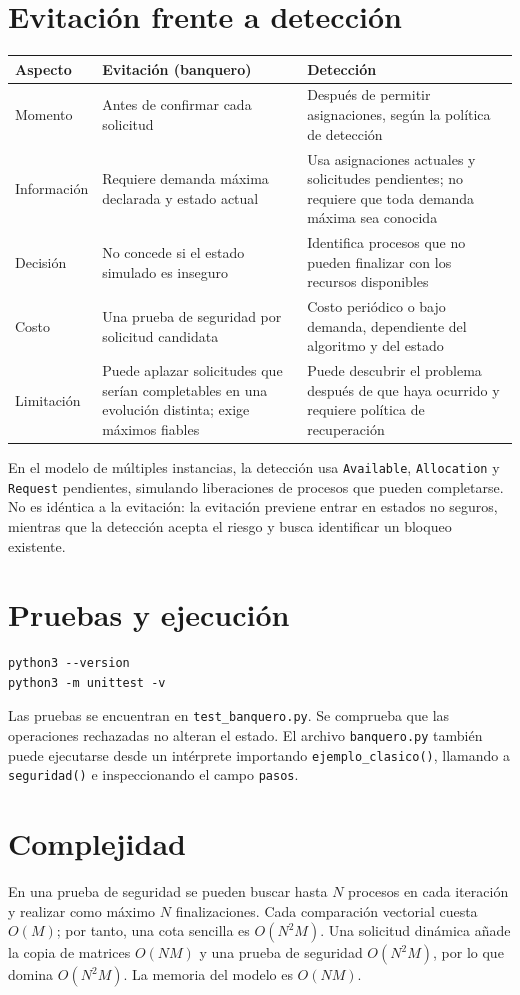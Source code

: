 \documentclass[12pt,a4paper]{article}
\begin{document}
\section{Evitación frente a detección}
\begin{table}[H]\centering\small
\begin{tabularx}{\linewidth}{p{2.6cm}X X}
\toprule
\textbf{Aspecto} & \textbf{Evitación (banquero)} & \textbf{Detección}\\\midrule
Momento & Antes de confirmar cada solicitud & Después de permitir asignaciones, según la política de detección\\
Información & Requiere demanda máxima declarada y estado actual & Usa asignaciones actuales y solicitudes pendientes; no requiere que toda demanda máxima sea conocida\\
Decisión & No concede si el estado simulado es inseguro & Identifica procesos que no pueden finalizar con los recursos disponibles\\
Costo & Una prueba de seguridad por solicitud candidata & Costo periódico o bajo demanda, dependiente del algoritmo y del estado\\
Limitación & Puede aplazar solicitudes que serían completables en una evolución distinta; exige máximos fiables & Puede descubrir el problema después de que haya ocurrido y requiere política de recuperación\\
\bottomrule
\end{tabularx}\end{table}
En el modelo de múltiples instancias, la detección usa \texttt{Available}, \texttt{Allocation} y \texttt{Request} pendientes, simulando liberaciones de procesos que pueden completarse. No es idéntica a la evitación: la evitación previene entrar en estados no seguros, mientras que la detección acepta el riesgo y busca identificar un bloqueo existente.
\section{Pruebas y ejecución}
\begin{lstlisting}[style=console]
python3 --version
python3 -m unittest -v
\end{lstlisting}
Las pruebas se encuentran en \texttt{test\_banquero.py}. Se comprueba que las operaciones rechazadas no alteran el estado. El archivo \texttt{banquero.py} también puede ejecutarse desde un intérprete importando \texttt{ejemplo\_clasico()}, llamando a \texttt{seguridad()} e inspeccionando el campo \texttt{pasos}.
\section{Complejidad}
En una prueba de seguridad se pueden buscar hasta $N$ procesos en cada iteración y realizar como máximo $N$ finalizaciones. Cada comparación vectorial cuesta $O(M)$; por tanto, una cota sencilla es $O(N^2M)$. Una solicitud dinámica añade la copia de matrices $O(NM)$ y una prueba de seguridad $O(N^2M)$, por lo que domina $O(N^2M)$. La memoria del modelo es $O(NM)$.
\end{document}

